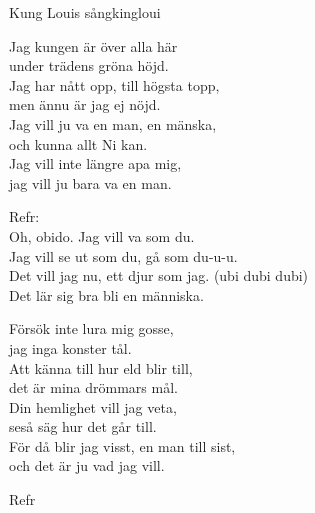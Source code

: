 \begin{song}{Kung Louis sång}{kingloui}
\begin{vers}
Jag kungen är över alla här\\
under trädens gröna höjd.\\
Jag har nått opp, till högsta topp,\\
men ännu är jag ej nöjd.\\
Jag vill ju va en man, en mänska, \\
och kunna allt Ni kan.\\
Jag vill inte längre apa mig, \\
jag vill ju bara va en man.\\
\end{vers}
\begin{vers}
Refr:\\
Oh, obido. Jag vill va som du.\\
Jag vill se ut som du, gå som du-u-u.\\
Det vill jag nu, ett djur som jag. (ubi dubi dubi)\\
Det lär sig bra bli en människa.\\
\end{vers}
\begin{vers}
Försök inte lura mig gosse, \\
jag inga konster tål.\\
Att känna till hur eld blir till, \\
det är mina drömmars mål.\\
Din hemlighet vill jag veta, \\
seså säg hur det går till.\\
För då blir jag visst, en man till sist, \\
och det är ju vad jag vill.\\
\end{vers}
\begin{vers}
Refr\\
\end{vers}
\end{song}
